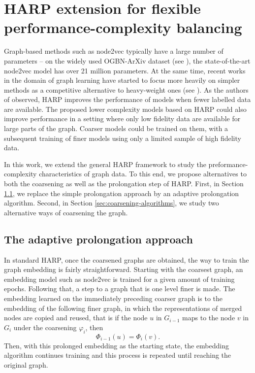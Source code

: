 \section{HARP extension for flexible performance-complexity balancing}\label{sec:our-method}

Graph-based methods such as node2vec typically have a large number of parameters -- on the widely used OGBN-ArXiv dataset (see \cite{hu_open_2021}), the state-of-the-art node2vec model has over 21 million parameters. At the same time, recent works in the domain of graph learning have started to focus more heavily on simpler methods as a competitive alternative to heavy-weight ones (see \cite{frasca_sign_2020,huang_combining_2020,salha_keep_2019,zhang_eigen-gnn_2021}). As the authors of \cite{chen_harp_2018} observed, HARP improves the performance of models when fewer labelled data are available. The proposed lower complexity models based on HARP could also improve performance in a setting where only low fidelity data are available for large parts of the graph. Coarser models could be trained on them, with a subsequent training of finer models using only a limited sample of high fidelity data.

In this work, we extend the general HARP framework to study the preformance-complexity characteristics of graph data. To this end, we propose alternatives to both the coarsening as well as the prolongation step of HARP. First, in Section \ref{sec:adaptive-prolongation}, we replace the simple prolongation approach by an adaptive prolongation algorithm. Second, in Section \ref{sec:coarsening-algorithms}, we study two alternative ways of coarsening the graph.

\subsection{The adaptive prolongation approach}\label{sec:adaptive-prolongation}

In standard HARP, once the coarsened graphs are obtained, the way to train the graph embedding is fairly straightforward. Starting with the coarsest graph, an embedding model such as node2vec is trained for a given amount of training epochs. Following that, a step to a graph that is one level finer is made. The embedding learned on the immediately preceding coarser graph is  to the embedding of the following finer graph, in which the representations of merged nodes are copied and reused, that is if the node \( u \) in \( G_{i - 1} \) maps to the node \( v \) in \( G_i \) under the coarsening \( \varphi_i \), then
\[ \Phi_{i - 1} \left( u \right) = \Phi_i \left( v \right)\text{.} \]
 Then, with this prolonged embedding as the starting state, the embedding algorithm continues training and this process is repeated until reaching the original graph.

